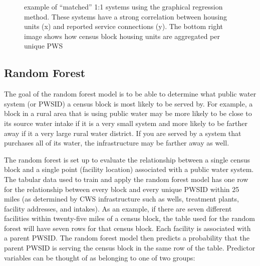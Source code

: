 \documentclass[12pt]{article}
\begin{document}
\begin{figure}


\caption{\label{fig-IA}example of ``matched'' 1:1 systems using the
graphical regression method. These systems have a strong correlation
between housing units (x) and reported service connections (y). The
bottom right image shows how census block housing units are aggregated
per unique PWS}

\end{figure}%

\subsection{Random Forest}\label{random-forest}

The goal of the random forest model is to be able to determine what
public water system (or PWSID) a census block is most likely to be
served by. For example, a block in a rural area that is using public
water may be more likely to be close to its source water intake if it is
a very small system and more likely to be farther away if it a very
large rural water district. If you are served by a system that purchases
all of its water, the infrastructure may be farther away as well.

The random forest is set up to evaluate the relationship between a
single census block and a single point (facility location) associated
with a public water system. The tabular data used to train and apply the
random forest model has one row for the relationship between every block
and every unique PWSID within 25 miles (as determined by CWS
infrastructure such as wells, treatment plants, facility addresses, and
intakes). As an example, if there are seven different facilities within
twenty-five miles of a census block, the table used for the random
forest will have seven rows for that census block. Each facility is
associated with a parent PWSID. The random forest model then predicts a
probability that the parent PWSID is serving the census block in the
same row of the table. Predictor variables can be thought of as
belonging to one of two groups:
\end{document}
